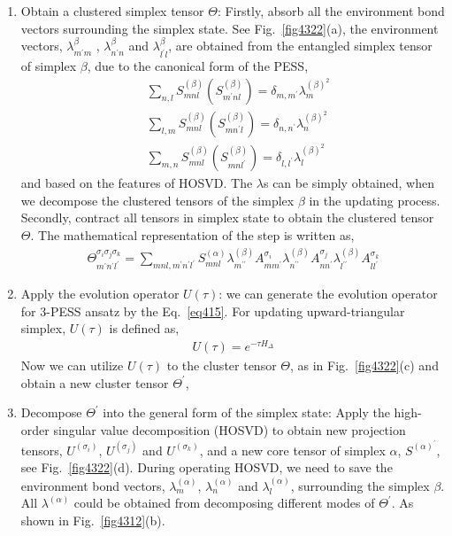 \begin{enumerate}
	\item Obtain a clustered simplex tensor $\Theta$: Firstly, absorb all the environment bond vectors surrounding the simplex state. See Fig.~\ref{fig4322}(a),  the environment vectors, $\lambda^{\beta}_{m^{\prime}m}$ , $\lambda^{\beta}_{n^{\prime}n}$ and $\lambda^{\beta}_{l^{\prime}l}$, are obtained from the entangled simplex tensor of simplex $\beta$, due to the canonical form of the PESS,
		\begin{align}
			&\sum_{n,l}{S^{(\beta)}_{mnl}\left( S^{(\beta)}_{m^{\prime}nl}\right)} = \delta_{m,m^{\prime}} \lambda^{(\beta)^2}_{m} \\
			&\sum_{l,m}{S^{(\beta)}_{mnl}\left( S^{(\beta)}_{mn^{\prime}l}\right)} = \delta_{n,n^{\prime}} \lambda^{(\beta)^2}_{n} \\
			&\sum_{m,n}{S^{(\beta)}_{mnl}\left( S^{(\beta)}_{mnl^{\prime}}\right)} = \delta_{l,l^{\prime}} \lambda^{(\beta)^2}_{l}
		\end{align}
		and based on the features of HOSVD. The $\lambda$s can be simply obtained, when we decompose the clustered tensors of the simplex $\beta$ in the updating process. Secondly, contract all tensors in simplex state to obtain the clustered tensor $\Theta$. The mathematical representation of the step is written as,  
		\begin{align}
			\Theta_{m^{\prime} n^{\prime} l^{\prime}}^{\sigma_i \sigma_j \sigma_k} = \sum_{mnl,m^{\prime}n^{\prime}l^{\prime}}{S^{(\alpha)}_{mnl} \lambda^{(\beta)}_{m^{\prime \prime}} A^{\sigma_i}_{mm^{\prime}} \lambda^{(\beta)}_{n^{\prime \prime}} A^{\sigma_j}_{nn^{\prime}} \lambda^{(\beta)}_{l^{\prime \prime}} A^{\sigma_k}_{ll^{\prime}}}
		\end{align}
	\item Apply the evolution operator $U(\tau)$: we can generate the evolution operator for 3-PESS ansatz by the Eq.~\ref{eq415}. For updating upward-triangular simplex, $U(\tau)$ is defined as, 
		\begin{align}
			U(\tau) = e^{-\tau H_{\Delta}}
		\end{align}
		Now we can utilize $U(\tau)$ to the cluster tensor $\Theta$, as in Fig.~\ref{fig4322}(c) and obtain a new cluster tensor $\Theta^{\prime}$, 
	\item Decompose $\Theta^{\prime}$ into the general form of the simplex state: Apply the high-order singular value decomposition (HOSVD) to obtain new projection tensors, $U^{(\sigma_i)}$, $U^{(\sigma_j)}$ and $U^{(\sigma_k)}$, and a new core tensor of simplex $\alpha$, $S^{(\alpha)^{\prime}}$, see Fig.~\ref{fig4322}(d). During operating HOSVD, we need to save the environment bond vectors, $\lambda^{(\alpha)}_{m}$, $\lambda^{(\alpha)}_{n}$ and $\lambda^{(\alpha)}_{l}$, surrounding the simplex $\beta$. All $\lambda^{(\alpha)}$ could be obtained from decomposing different modes of $\Theta^{\prime}$. As shown in Fig.~\ref{fig4312}(b).

\end{enumerate}
